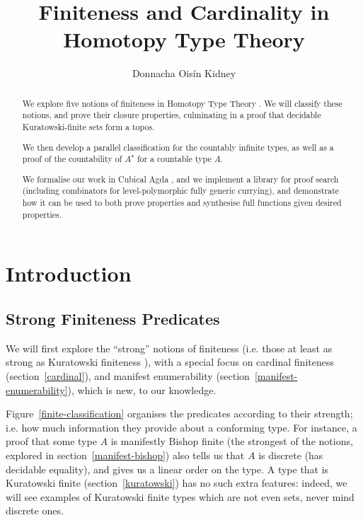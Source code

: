 
\title{Finiteness and Cardinality in Homotopy Type Theory}
\author{Donnacha Oisín Kidney}

\maketitle
\begin{abstract}
  We explore five notions of finiteness in Homotopy Type Theory \cite{hottbook}.
  We will classify these notions, and prove their closure properties,
  culminating in a proof that decidable Kuratowski-finite sets
  \cite{kuratowskiNotionEnsembleFini1920} form a topos.

  We then develop a parallel classification for the countably infinite types, as
  well as a proof of the countability of \(A^\star\) for a countable type \(A\).

  We formalise our work in Cubical Agda
  \cite{vezzosiCubicalAgdaDependently2019}, and we implement a library for proof
  search (including combinators for level-polymorphic fully generic currying),
  and demonstrate how it can be used to both prove properties and synthesise
  full functions given desired properties.
\end{abstract}
\section{Introduction}
\subsection{Strong Finiteness Predicates}
We will first explore the ``strong'' notions of finiteness (i.e. those at least
as strong as Kuratowski finiteness \cite{kuratowskiNotionEnsembleFini1920}),
with a special focus on cardinal finiteness (section~\ref{cardinal}), and
manifest enumerability (section~\ref{manifest-enumerability}), which is new, to
our knowledge.

Figure~\ref{finite-classification} organises the predicates according to
their strength; i.e. how much information they provide about a conforming
type.
For instance, a proof that some type \(A\) is manifestly Bishop finite (the
strongest of the notions, explored in section~\ref{manifest-bishop}) also tells
us that \(A\) is discrete (has decidable equality), and gives us a linear order
on the type.
A type that is Kuratowski finite (section~\ref{kuratowski}) has no such extra
features: indeed, we will see examples of Kuratowski finite types which are not
even sets, never mind discrete ones.

